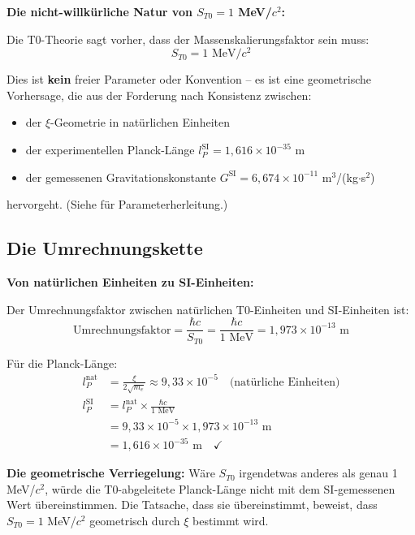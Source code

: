 	\begin{keyresult}
		\textbf{Die nicht-willkürliche Natur von $S_{T0} = 1$ MeV/$c^2$:}
		
		Die T0-Theorie sagt vorher, dass der Massenskalierungsfaktor sein muss:
		\begin{equation}
			\boxed{S_{T0} = 1 \text{ MeV}/c^2}
		\end{equation}
		
		Dies ist \textbf{kein} freier Parameter oder Konvention -- es ist eine geometrische Vorhersage, die aus der Forderung nach Konsistenz zwischen:
		\begin{itemize}
			\item der $\xi$-Geometrie in natürlichen Einheiten
			\item der experimentellen Planck-Länge $l_P^{\text{SI}} = 1{,}616 \times 10^{-35}$ m
			\item der gemessenen Gravitationskonstante $G^{\text{SI}} = 6{,}674 \times 10^{-11}$ m$^3$/(kg$\cdot$s$^2$)
		\end{itemize}
		hervorgeht. (Siehe \cite{parameterherleitung_De} für Parameterherleitung.)
	\end{keyresult}
	
	\subsection{Die Umrechnungskette}
	
	\begin{derivation}
		\textbf{Von natürlichen Einheiten zu SI-Einheiten:}
		
		Der Umrechnungsfaktor zwischen natürlichen T0-Einheiten und SI-Einheiten ist:
		\begin{equation}
			\text{Umrechnungsfaktor} = \frac{\hbar c}{S_{T0}} = \frac{\hbar c}{1 \text{ MeV}} = 1{,}973 \times 10^{-13} \text{ m}
		\end{equation}
		
		Für die Planck-Länge:
		\begin{align}
			l_P^{\text{nat}} &= \frac{\xi}{2\sqrt{m_e}} \approx 9{,}33 \times 10^{-5} \quad \text{(natürliche Einheiten)} \\
			l_P^{\text{SI}} &= l_P^{\text{nat}} \times \frac{\hbar c}{1 \text{ MeV}} \\
			&= 9{,}33 \times 10^{-5} \times 1{,}973 \times 10^{-13} \text{ m} \\
			&= 1{,}616 \times 10^{-35} \text{ m} \quad \checkmark
		\end{align}
		
		\textbf{Die geometrische Verriegelung:} Wäre $S_{T0}$ irgendetwas anderes als genau 1 MeV/$c^2$, würde die T0-abgeleitete Planck-Länge nicht mit dem SI-gemessenen Wert übereinstimmen. Die Tatsache, dass sie übereinstimmt, beweist, dass $S_{T0} = 1$ MeV/$c^2$ geometrisch durch $\xi$ bestimmt wird.
	\end{derivation}
	
